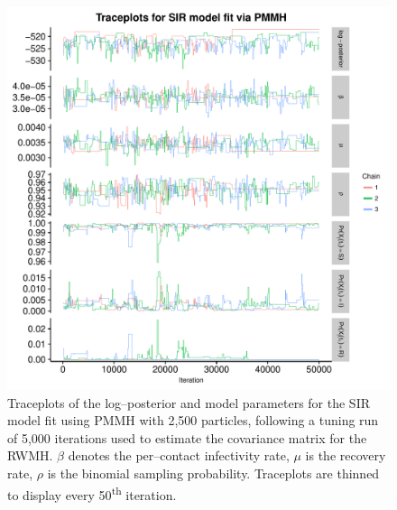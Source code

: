 \begin{figure}[htbp]
	\centering
	\includegraphics[width=0.9\linewidth]{figures/misspec_sir_pmmh_traceplots.pdf}
	\caption[Simulation 2 MCMC traceplots for SIR model parameters fit using PMMH.]{Traceplots of the log--posterior and model parameters for the SIR model fit using PMMH with 2,500 particles, following a tuning run of 5,000 iterations used to estimate the covariance matrix for the RWMH. $ \beta $ denotes the per--contact infectivity rate, $ \mu $ is the recovery rate, $ \rho $ is the binomial sampling probability. Traceplots are thinned to display every 50\textsuperscript{th} iteration.}
	\label{fig:misspec_sir_pmmh_traceplots}
\end{figure}

